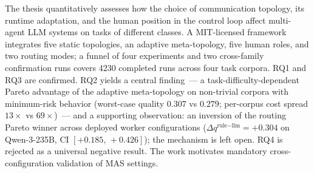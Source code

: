 The thesis quantitatively assesses how the choice of communication
topology, its runtime adaptation, and the human position in the control
loop affect multi-agent LLM systems on tasks of different classes.
A MIT-licensed framework integrates five static topologies, an adaptive
meta-topology, five human roles, and two routing modes; a funnel of
four experiments and two cross-family confirmation runs covers 4230
completed runs across four task corpora. RQ1 and RQ3 are confirmed.
RQ2 yields a central finding~--- a task-difficulty-dependent Pareto
advantage of the adaptive meta-topology on non-trivial corpora with
minimum-risk behavior (worst-case quality $0.307$ vs $0.279$;
per-corpus cost spread $13\times$ vs $69\times$)~--- and a supporting
observation: an inversion of the routing Pareto winner across deployed
worker configurations ($\Delta q^{\text{rule}-\text{llm}}=+0.304$
on Qwen-3-235B, CI $[+0.185,\,+0.426]$); the mechanism is left open.
RQ4 is rejected as a universal negative result. The work motivates
mandatory cross-configuration validation of MAS settings.

